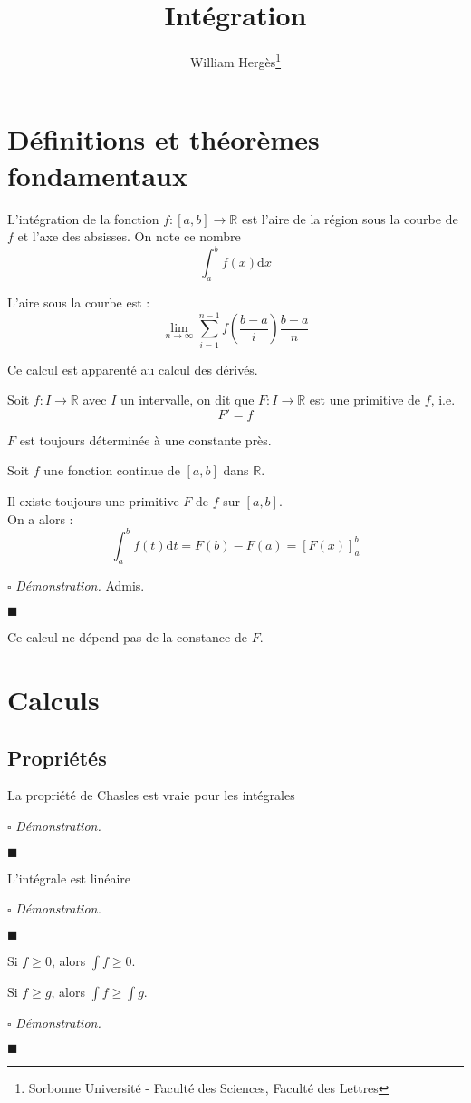 \documentclass[a4paper, titlepage]{article}
\title{Intégration}
\author{William Hergès\thanks{Sorbonne Université - Faculté des Sciences, Faculté des Lettres}}
\renewenvironment{proof}{$\square$ \footnotesize\textit{Démonstration.}}{\begin{flushright}$\blacksquare$\end{flushright}}
\begin{document}
	\maketitle
	\tableofcontents
	\newpage
	\section{Définitions et théorèmes fondamentaux}
	\begin{defn}
		L'intégration de la fonction $f: [a,b]\to \mathbb{R}$ est l'aire de la région sous la courbe de $f$ et l'axe des absisses. On note ce nombre $$ \int^b_af(x)\mathrm{d}x $$

		L'aire sous la courbe est :
		$$ \lim_{n \to \infty} \sum_{i=1}^{n-1} f\left( \frac{b-a}{i} \right) \frac{b-a}{n} $$
	\end{defn}

	Ce calcul est apparenté au calcul des dérivés.
	\begin{defn}
		Soit $f:I\to \mathbb{R}$ avec $I$ un intervalle, on dit que $F:I\to \mathbb{R}$ est une primitive de $f$, i.e. $$ F'=f $$
	\end{defn}
	$F$ est toujours déterminée à une constante près.
	\begin{thm}
		Soit $f$ une fonction continue de $[a,b]$ dans $\mathbb{R}$.

		Il existe toujours une primitive $F$ de $f$ sur $[a,b]$.\\
		On a alors :
		$$ \int^b_a f(t)\mathrm{d}t = F(b)-F(a) = [F(x)]_a^b $$
	\end{thm}
	\begin{proof}
		Admis.
	\end{proof}
	Ce calcul ne dépend pas de la constance de $F$.
	\section{Calculs}
	\subsection{Propriétés}
	\begin{props}
		La propriété de Chasles est vraie pour les intégrales
	\end{props}
	\begin{proof}
		\AQT
	\end{proof}
	\begin{props}
		L'intégrale est linéaire
	\end{props}
	\begin{proof}
		\AQT
	\end{proof}
	\begin{props}
		Si $f\geqslant 0$, alors $\int f\geqslant 0$.

		Si $f \geqslant g$, alors $\int f \geqslant \int g$.
	\end{props}
	\begin{proof}
		\AQT
	\end{proof}
\end{document}
